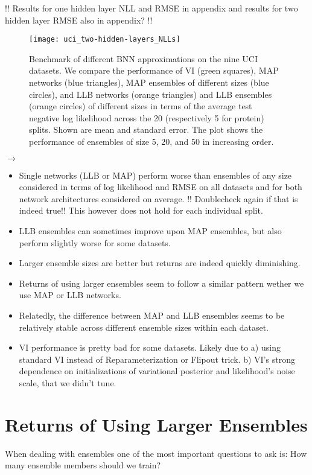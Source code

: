 \documentclass[../thesis.tex]{subfiles}
\begin{document}
!! Results for one hidden layer NLL and RMSE in appendix and results for two hidden layer RMSE also in appendix? !!
\begin{figure}
    \centering
    \texttt{[image: uci\_two-hidden-layers\_NLLs]} 
    \caption{Benchmark of different BNN approximations on the nine UCI datasets. We compare the performance of VI (green squares), MAP networks (blue triangles), MAP ensembles of different sizes (blue circles), and LLB networks (orange triangles) and LLB ensembles (orange circles) of different sizes in terms of the average test negative log likelihood across the 20 (respectively 5 for protein) splits. Shown are mean and standard error. The plot shows the performance of ensembles of size 5, 20, and 50 in increasing order.}
    \label{fig:uci-benchmark}
\end{figure}

$\rightarrow$
\begin{itemize}
    \item Single networks (LLB or MAP) perform worse than ensembles of any size considered in terms of log likelihood and RMSE on all datasets and for both network architectures considered on average. !! Doublecheck again if that is indeed true!! This however does not hold for each individual split.
    \item LLB ensembles can sometimes improve upon MAP ensembles, but also perform slightly worse for some datasets.
    \item Larger ensemble sizes are better but returns are indeed quickly diminishing.
    \item Returns of using larger ensembles seem to follow a similar pattern wether we use MAP or LLB networks.
    \item Relatedly, the difference between MAP and LLB ensembles seems to be relatively stable across different ensemble sizes within each dataset.
    \item VI performance is pretty bad for some datasets. Likely due to a) using standard VI instead of Reparameterization or Flipout trick. b) VI's strong dependence on initializations of variational posterior and likelihood's noise scale, that we didn't tune.
\end{itemize}



\section{Returns of Using Larger Ensembles}
When dealing with ensembles one of the most important questions to ask is: How many ensemble members should we train? 
\end{document}
